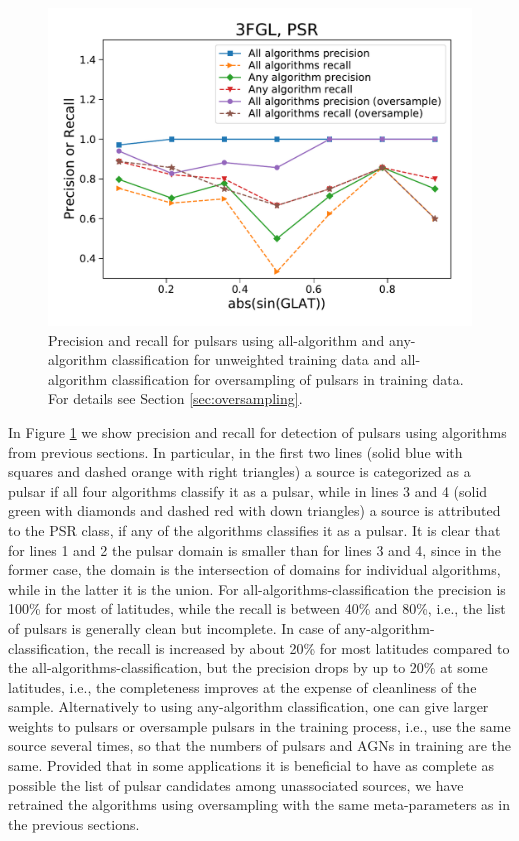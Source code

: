 \begin{figure}[h]
\includegraphics[width=\twopicsp\textwidth]{plots/All_algs_3FGL_precision_recall_oversample.pdf}
\caption{Precision and recall for pulsars using all-algorithm and any-algorithm classification for unweighted training data and
all-algorithm classification for oversampling of pulsars in training data. For details see Section \ref{sec:oversampling}.}
\label{fig:prec_recall}
\end{figure}


In Figure \ref{fig:prec_recall} we show precision and recall for detection of pulsars using algorithms from previous sections.
In particular, in the first two lines (solid blue with squares and dashed orange with right triangles) a source is categorized as a pulsar if all four algorithms classify it as a pulsar,
while in lines 3 and 4 (solid green with diamonds and dashed red with down triangles) a source is attributed to the PSR class, if any of the algorithms classifies it as a pulsar.
It is clear that for lines 1 and 2 the pulsar domain is smaller than for lines 3 and 4, since in the former case, the domain is the intersection of domains for individual algorithms, while in the latter it is the union.
For all-algorithms-classification the precision is 100\% for most of latitudes, while the recall is between 40\% and 80\%, i.e., the list of pulsars is generally clean but incomplete.
In case of any-algorithm-classification, the recall is increased by about 20\% for most latitudes compared to the all-algorithms-classification, but the precision drops by up to 20\% at some latitudes, i.e., the completeness improves at the expense of cleanliness of the sample.
Alternatively to using any-algorithm classification, one can give larger weights to pulsars or oversample pulsars in the training process, i.e., use the same source several times, so that the numbers of pulsars and AGNs in training are the same.
Provided that in some applications it is beneficial to have as complete as possible the list of pulsar candidates among unassociated sources, we have retrained the algorithms using oversampling with the same meta-parameters as in the previous sections.


